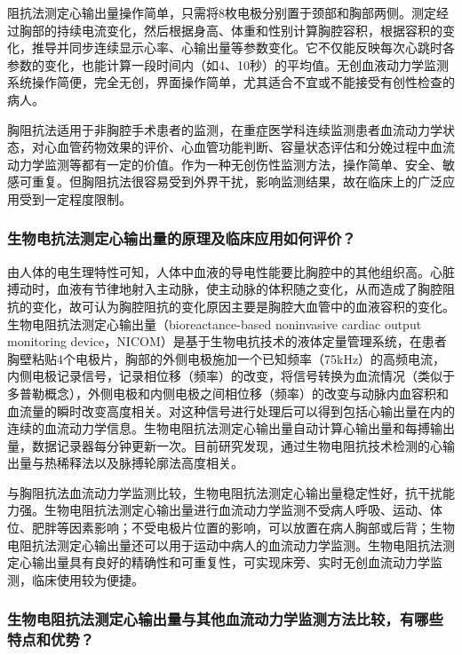 阻抗法测定心输出量操作简单，只需将8枚电极分别置于颈部和胸部两侧。测定经过胸部的持续电流变化，然后根据身高、体重和性别计算胸腔容积，根据容积的变化，推导并同步连续显示心率、心输出量等参数变化。它不仅能反映每次心跳时各参数的变化，也能计算一段时间内（如4、10秒）的平均值。无创血液动力学监测系统操作简便，完全无创，界面操作简单，尤其适合不宜或不能接受有创性检查的病人。

胸阻抗法适用于非胸腔手术患者的监测，在重症医学科连续监测患者血流动力学状态，对心血管药物效果的评价、心血管功能判断、容量状态评估和分娩过程中血流动力学监测等都有一定的价值。作为一种无创伤性监测方法，操作简单、安全、敏感可重复。但胸阻抗法很容易受到外界干扰，影响监测结果，故在临床上的广泛应用受到一定程度限制。

\subsubsection{生物电抗法测定心输出量的原理及临床应用如何评价？}

由人体的电生理特性可知，人体中血液的导电性能要比胸腔中的其他组织高。心脏搏动时，血液有节律地射入主动脉，使主动脉的体积随之变化，从而造成了胸腔阻抗的变化，故可认为胸腔阻抗的变化原因主要是胸腔大血管中的血液容积的变化。生物电阻抗法测定心输出量（bioreactance-based
noninvasive cardiac output monitoring
device，NICOM）是基于生物电抗技术的液体定量管理系统，在患者胸壁粘贴4个电极片，胸部的外侧电极施加一个已知频率（75kHz）的高频电流，内侧电极记录信号，记录相位移（频率）的改变，将信号转换为血流情况（类似于多普勒概念），外侧电极和内侧电极之间相位移（频率）的改变与动脉内血容积和血流量的瞬时改变高度相关。对这种信号进行处理后可以得到包括心输出量在内的连续的血流动力学信息。生物电阻抗法测定心输出量自动计算心输出量和每搏输出量，数据记录器每分钟更新一次。目前研究发现，通过生物电阻抗技术检测的心输出量与热稀释法以及脉搏轮廓法高度相关。

与胸阻抗法血流动力学监测比较，生物电阻抗法测定心输出量稳定性好，抗干扰能力强。生物电阻抗法测定心输出量进行血流动力学监测不受病人呼吸、运动、体位、肥胖等因素影响；不受电极片位置的影响，可以放置在病人胸部或后背；生物电阻抗法测定心输出量还可以用于运动中病人的血流动力学监测。生物电阻抗法测定心输出量具有良好的精确性和可重复性，可实现床旁、实时无创血流动力学监测，临床使用较为便捷。

\subsubsection{生物电阻抗法测定心输出量与其他血流动力学监测方法比较，有哪些特点和优势？}

